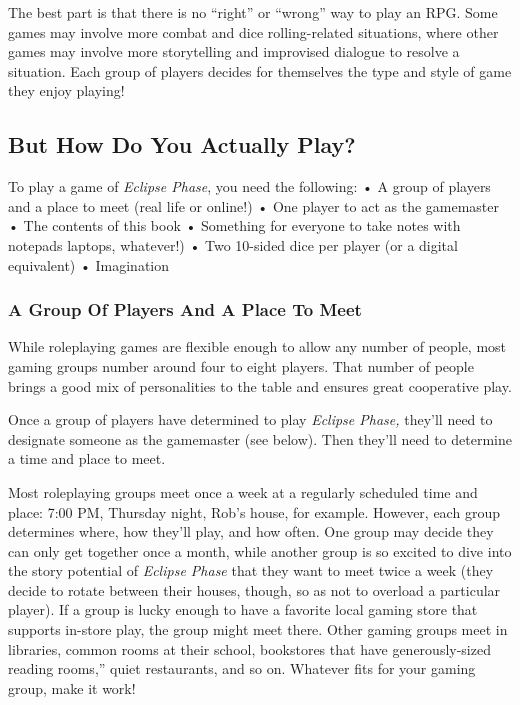 The best part is that there is no ``right'' or ``wrong'' 
way to play an RPG. Some games may involve more 
combat and dice rolling-related situations, where other 
games may involve more storytelling and improvised 
dialogue to resolve a situation. Each group of players 
decides for themselves the type and style of game they 
enjoy playing!

\subsection{But How Do You Actually Play?}

To play a game of \textit{Eclipse Phase}, you need the following:
•  A group of players and a place to meet (real life 
or online!)
•  One player to act as the gamemaster
•  The contents of this book
• Something for everyone to take notes with notepads
laptops, whatever!)
•  Two 10-sided dice per player (or a digital 
equivalent)
•  Imagination

\subsubsection{A Group Of Players And A Place To Meet}

While roleplaying games are flexible enough to allow 
any number of people, most gaming groups number 
around four to eight players. That number of people 
brings a good mix of personalities to the table and 
ensures great cooperative play.

Once a group of players have determined to play 
\textit{Eclipse Phase,} they'll need to designate someone as 
the gamemaster (see below). Then they'll need to determine
a time and place to meet.

Most roleplaying groups meet once a week at a regularly
scheduled time and place: 7:00 PM, Thursday
night, Rob's house, for example. However, each group 
determines where, how they'll play, and how often. 
One group may decide they can only get together 
once a month, while another group is so excited to 
dive into the story potential of \textit{Eclipse Phase} that 
they want to meet twice a week (they decide to rotate 
between their houses, though, so as not to overload 
a particular player). If a group is lucky enough to 
have a favorite local gaming store that supports in-store
play, the group might meet there. Other gaming
groups meet in libraries, common rooms at their 
school, bookstores that have generously-sized reading
rooms,'' quiet restaurants, and so on. Whatever
fits for your gaming group, make it work!

